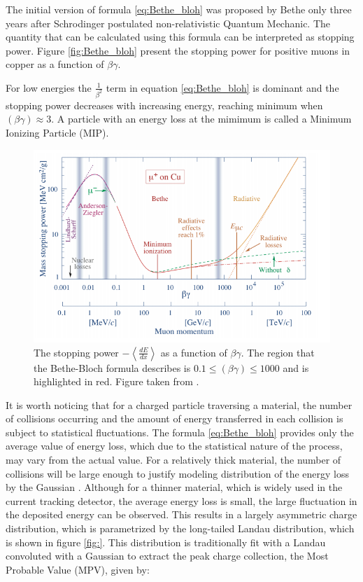 The initial version of formula \ref{eq:Bethe_bloh} was proposed by Bethe \cite{Bethe} only three years after Schrodinger postulated non-relativistic Quantum Mechanic. The quantity that can be calculated using this formula can be interpreted as stopping power. Figure \ref{fig:Bethe_bloh} present the stopping power for positive muons in copper as a function of $\beta \gamma$. 

For low energies the $\frac{1}{\beta^2}$ term in equation \ref{eq:Bethe_bloh} is dominant and the stopping power decreases with increasing energy, reaching minimum when $(\beta \gamma) \approx 3 $. A particle with an energy loss at the mimimum is called a Minimum Ionizing Particle (MIP). 



\begin{figure}[h]
\centering
\includegraphics{figures/Bete_bloh.PNG}
\caption{ The stopping power $-\left< \frac{dE}{dx} \right>$ as a function of $\beta \gamma$. The region that the Bethe-Bloch formula describes is $0.1 \le (\beta \gamma) \le 1000$ and is highlighted in red. Figure taken from \cite{PDG}.
\label{fig:event display}}
\end{figure}


It is worth noticing that for a charged particle traversing a material, the number of collisions occurring and the amount of energy transferred in each collision is subject to statistical fluctuations. The formula \ref{eq:Bethe_bloh} provides only the average value of energy loss, which due to the statistical nature of the process, may vary from the actual value. 
For a relatively thick material, the number of collisions will be large enough to justify modeling distribution of the energy loss by the Gaussian \cite{gauss_sensor}. Although for a thinner material, which is widely used in the current tracking detector, the average energy loss is small, the large fluctuation in the deposited energy can be observed.    
 This results in a largely asymmetric charge distribution, which is parametrized by the long-tailed Landau distribution, which is shown in figure \ref{fig:}.  This distribution is traditionally fit with a Landau convoluted with a Gaussian to extract the peak charge collection, the Most Probable Value (MPV), given by:

